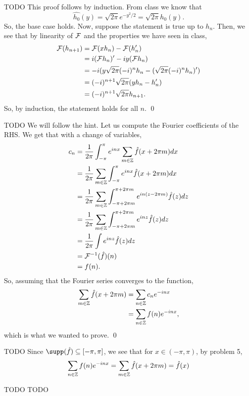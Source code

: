 \documentclass{article}
\begin{document}
\newpage
{} TODO \tri
\hop 
\solution
This proof follows by induction. From class we know that 
\[\hat{h_0}(y)=\sqrt{2\pi}e^{-y^2/2} = \sqrt{2\pi}h_0(y).\] 
So, the base case holds. Now, suppose the statement is true up to $h_n$. Then, we see that by linearity of $\cal{F}$ and the properties we have seen in class,
\begin{align*}
    \cal{F}(h_{n+1}) &= \cal{F}(xh_n)-\cal{F}(h_n')\\
    &= i(\cal{F}h_n)' - iy(\cal{F}h_n) \\
    &= -i(y\sqrt{2\pi}(-i)^n h_n - (\sqrt{2\pi}(-i)^n h_n)') \\
    &= (-i)^{n+1}\sqrt{2\pi}(yh_n - h_n')\\
    &= (-i)^{n+1}\sqrt{2\pi}h_{n+1}.
\end{align*}
So, by induction, the statement holds for all $n$. \qed

\newpage
{} TODO  \tri
\hop 
\solution
We will follow the hint. Let us compute the Fourier coefficients of the RHS. We get that with a change of variables,
\begin{align*}
    c_n  &= \frac{1}{2\pi} \int_{-\pi}^\pi e^{inx}\sum_{m \in \ZZ}\hat{f}(x+2\pi m) dx \\
    &= \frac{1}{2\pi} \sum_{m \in \ZZ} \int_{-\pi}^\pi e^{inx}\hat{f}(x+2\pi m) dx \\
    &= \frac{1}{2\pi} \sum_{m \in \ZZ} \int_{-\pi+2\pi m}^{\pi+2\pi m} e^{in(z - 2\pi m)}\hat{f}(z) dz \\
    &= \frac{1}{2\pi} \sum_{m \in \ZZ} \int_{-\pi+2\pi m}^{\pi+2\pi m} e^{inz}\hat{f}(z) dz \\
    &= \frac{1}{2\pi} \int e^{inz}\hat{f}(z) dz \\
    &= \cal{F}\inv(\hat{f})(n) \\
    &= f(n).
\end{align*}
So, assuming that the Fourier series converges to the function, 
\begin{align*}
    \sum_{m \in \ZZ}\hat{f}(x+2\pi m) &=  \sum_{n \in \ZZ}c_ne^{-inx}\\
    &= \sum_{n \in \ZZ}f(n)e^{-inx},
\end{align*}
which is what we wanted to prove. \qed


\newpage
{} TODO  \tri
\hop 
\solution
Since $\supp(\hat{f}) \sse [-\pi, \pi]$, we see that for $x \in (-\pi,\pi)$, by problem 5,
\begin{align*}
    \sum_{n \in \ZZ}f(n) e^{-inx} = \sum_{m \in \ZZ} \hat{f}(x + 2\pi m) = \hat{f}(x)
\end{align*}


\newpage
{} TODO  \tri
\hop 
\solution
TODO
\end{document}
